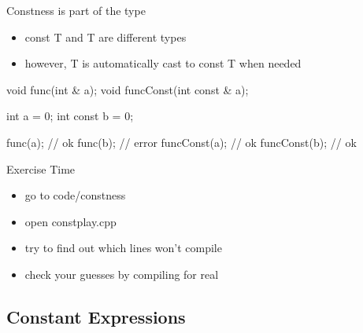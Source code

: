 \begin{frame}[fragile]
  \begin{block}{Constness is part of the type}
    \begin{itemize}
    \item const T and T are different types
    \item however, T is automatically cast to const T when needed
    \end{itemize}
  \end{block}
  \begin{cppcode}
    void func(int & a);
    void funcConst(int const & a);

    int a = 0;
    int const b = 0;

    func(a);      // ok
    func(b);      // error
    funcConst(a); // ok
    funcConst(b); // ok
  \end{cppcode}
\end{frame}

\begin{frame}[fragile]
  \begin{alertblock}{Exercise Time}
    \begin{itemize}
    \item go to code/constness
    \item open constplay.cpp
    \item try to find out which lines won't compile
    \item check your guesses by compiling for real
    \end{itemize}
  \end{alertblock}
\end{frame}

\subsection[cstexpr]{Constant Expressions}

